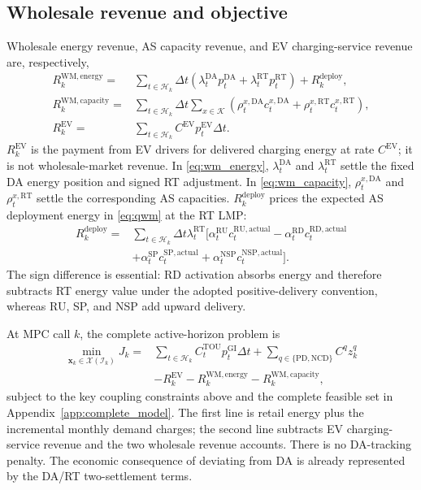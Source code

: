 \documentclass[final,5p,times]{elsarticle}
\newcommand{\dt}{\Delta t}
\newcommand{\EV}{\mathrm{EV}}
\newcommand{\DA}{\mathrm{DA}}
\newcommand{\RT}{\mathrm{RT}}
\newcommand{\GI}{\mathrm{GI}}
\newcommand{\TOU}{\mathrm{TOU}}
\newcommand{\PD}{\mathrm{PD}}
\newcommand{\NCD}{\mathrm{NCD}}
\newcommand{\RU}{\mathrm{RU}}
\newcommand{\RD}{\mathrm{RD}}
\newcommand{\SP}{\mathrm{SP}}
\newcommand{\NSP}{\mathrm{NSP}}
\newcommand{\WM}{\mathrm{WM}}
\newcommand{\actual}{\mathrm{actual}}
\newcommand{\calH}{\mathcal{H}}
\newcommand{\calK}{\mathcal{K}}
\begin{document}
\subsection{Wholesale revenue and objective}
Wholesale energy revenue, AS capacity revenue, and EV charging-service revenue
are, respectively,
\begin{align}
R_k^{\WM,\mathrm{energy}}
={}&\sum_{t\in\calH_k}\dt
\left(\lambda_t^{\DA}p_t^{\DA}
+\lambda_t^{\RT}p_t^{\RT}\right)+R_k^{\mathrm{deploy}}, \label{eq:wm_energy}\\
R_k^{\WM,\mathrm{capacity}}
={}&\sum_{t\in\calH_k}\dt\sum_{x\in\calK}
\left(\rho_t^{x,\DA}c_t^{x,\DA}
+\rho_t^{x,\RT}c_t^{x,\RT}\right), \label{eq:wm_capacity}\\
R_k^{\EV}
={}&\sum_{t\in\calH_k}C^{\EV}p_t^{\EV}\dt. \label{eq:ev_revenue}
\end{align}
$R_k^{\EV}$ is the payment from EV drivers for delivered charging energy at
rate $C^{\EV}$; it is not wholesale-market revenue. In
\eqref{eq:wm_energy}, $\lambda_t^{\DA}$ and $\lambda_t^{\RT}$ settle the fixed
DA energy position and signed RT adjustment. In \eqref{eq:wm_capacity},
$\rho_t^{x,\DA}$ and $\rho_t^{x,\RT}$ settle the corresponding AS capacities.
$R_k^{\mathrm{deploy}}$ prices the expected AS deployment energy in
\eqref{eq:qwm} at the RT LMP:
\begin{align}
R_k^{\mathrm{deploy}}
={}&\sum_{t\in\calH_k}\dt\lambda_t^{\RT}
\bigg[\alpha_t^{\RU}c_t^{\RU,\actual}
-\alpha_t^{\RD}c_t^{\RD,\actual}\nonumber\\
&+\alpha_t^{\SP}c_t^{\SP,\actual}
+\alpha_t^{\NSP}c_t^{\NSP,\actual}\bigg].
\label{eq:wm_deployment_revenue}
\end{align}
The sign difference is essential: RD activation absorbs energy and therefore
subtracts RT energy value under the adopted positive-delivery convention,
whereas RU, SP, and NSP add upward delivery.

At MPC call $k$, the complete active-horizon problem is
\begin{align}
\min_{\boldsymbol{x}_k\in\mathcal{X}(\mathcal{I}_k)}
J_k={}&
\sum_{t\in\calH_k}C_t^{\TOU}p_t^{\GI}\dt
+\sum_{q\in\{\PD,\NCD\}}C^qz_k^q \nonumber\\
&-R_k^{\EV}
-R_k^{\WM,\mathrm{energy}}
-R_k^{\WM,\mathrm{capacity}}, \label{eq:objective}
\end{align}
subject to the key coupling constraints above and the complete feasible set in
Appendix~\ref{app:complete_model}. The first line is retail energy plus the
incremental monthly demand charges; the second line subtracts EV
charging-service revenue and the two wholesale revenue accounts. There is no
DA-tracking penalty. The economic
consequence of deviating from DA is already represented by the DA/RT
two-settlement terms.
\end{document}
